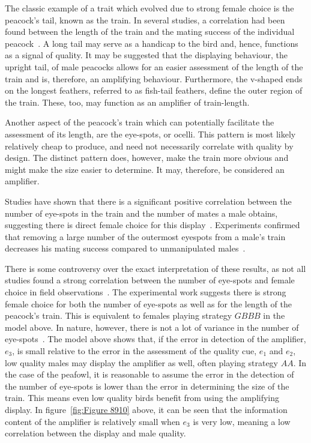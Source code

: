 \documentclass[a4paper,12pt]{article}
\numberwithin{equation}{section}
\begin{document}
The classic example of a trait which evolved due to strong female choice is the peacock's tail, known as the train. In several studies, a correlation had been found between the length of the train and the mating success of the individual peacock~\cite{Yasmin1996, Petrie1991}. A long tail may serve as a handicap to the bird and, hence, functions as a signal of quality. It may be suggested that the displaying behaviour, the upright tail, of male peacocks allows for an easier assessment of the length of the train and is, therefore, an amplifying behaviour. Furthermore, the v-shaped ends on the longest feathers, referred to as fish-tail feathers, define the outer region of the train. These, too, may function as an amplifier of train-length.

Another aspect of the peacock's train which can potentially facilitate the assessment of its length, are the eye-spots, or ocelli. This pattern is most likely relatively cheap to produce, and need not necessarily correlate with quality by design. The distinct pattern does, however, make the train more obvious and might make the size easier to determine. It may, therefore, be considered an amplifier.

Studies have shown that there is a significant positive correlation between the number of eye-spots in the train and the number of mates a male obtains, suggesting there is direct female choice for this display~\cite{Petrie1991, Loyau2005}. Experiments confirmed that removing a large number of the outermost eyespots from a male's train decreases his mating success compared to unmanipulated males~\cite{Petrie1994, Dakin2011}.

There is some controversy over the exact interpretation of these results, as not all studies found a strong correlation between the number of eye-spots and female choice in field observations~\cite{Takahashi2008, Loyau2008, Dakin2011}. The experimental work suggests there is strong female choice for both the number of eye-spots as well as for the length of the peacock's train. This is equivalent to females playing strategy $GBBB$ in the model above. In nature, however, there is not a lot of variance in the number of eye-spots~\cite{Dakin2011}. The model above shows that, if the error in detection of the amplifier, $e_{3}$, is small relative to the error in the assessment of the quality cue, $e_{1}$ and $e_{2}$, low quality males may display the amplifier as well, often playing strategy $AA$. In the case of the peafowl, it is reasonable to assume the error in the detection of the number of eye-spots is lower than the error in determining the size of the train. This means even low quality birds benefit from using the amplifying display. In figure~\ref{fig:Figure 8910} above, it can be seen that the information content of the amplifier is relatively small when $e_{3}$ is very low, meaning a low correlation between the display and male quality.
\end{document}

